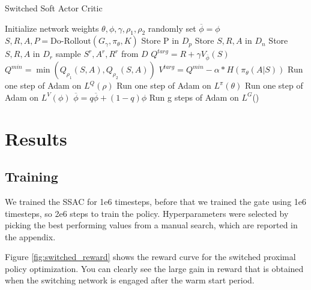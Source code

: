 \documentclass[letterpaper, 10 pt, conference]{ieeeconf}
\begin{document}
\begin{algorithm}
\caption{Switched Soft Actor Critic}\label{euclid}
\begin{algorithmic}[1]
\State Initialize network weights $\theta ,\phi, \gamma, \rho_{1}, \rho_{2}$ randomly
\State set $\overline \phi = \phi$
\State $S,R,A,P = \text{Do-Rollout}(G_{\gamma}, \pi_{\theta}, K)$
\State Store P in $D_{p}$
\State Store $S,R,A$ in $D_{n}$
\Else
\State Store $S,R,A$ in $D_{r}$
\EndIf
{}
\State sample $S^{r}, A^{r}, R^{r}$ from $D$
\State $Q^{targ} = R + \gamma V_{\overline{\phi}}(S)$
\State $Q^{min} = \min(Q_{\rho_{1}}(S,A), Q_{\rho_{2}}(S,A))$
\State $V^{targ} = Q^{min} - \alpha*H(\pi_{\theta} (A|S))$
\State Run one step of Adam on $L^{Q}(\rho)$
\State Run one step of Adam on $L^{\pi}(\theta)$
\State Run one step of Adam on $L^{V}(\phi)$
\State   $\overline \phi =  q \overline \phi + (1-q)\phi$
\EndIf
{}
\State Run g steps of Adam on $L^{G}$(\phi)
\EndFor
\end{algorithmic}
\end{algorithm}

\section{Results}

\subsection{Training} 
We trained the SSAC for 1e6 timesteps, before that we trained the gate using 1e6 timesteps, so 2e6 steps to train the policy. Hyperparameters were selected by picking the best performing values from a manual search, which are reported in the appendix.

Figure \ref{fig:switched_reward} shows the reward curve for the switched proximal policy optimization. You can clearly see the large gain in reward that is obtained when the switching network is engaged after the warm start period.
\end{document}
